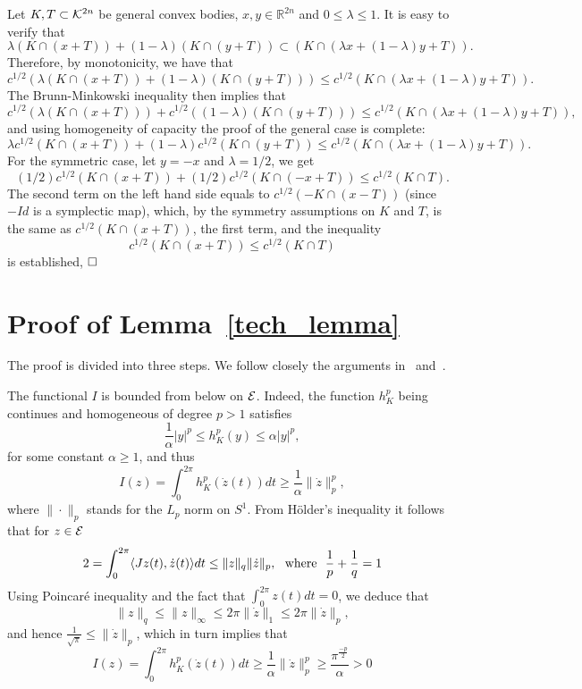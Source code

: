 \documentclass[12pt]{article}
\def\R{{\mathbb R}}
\begin{document}
 Let
$K,T \subset {\cal K}^{2n}$ be general convex bodies, $x,y \in
\R^{2n}$ and $0\le \lambda \le 1$. It is easy to verify that
\[ \lambda (K \cap (x+T)) + (1-\lambda) (K \cap
(y+T)) \subset (K \cap (\lambda x+(1-\lambda) y+ T)).\]
%
Therefore, by monotonicity, we have that
\[ c^{1/2}\left(\lambda (K \cap (x+T)) + (1-\lambda) (K \cap
(y+T))\right) \le  c^{1/2}\left(K \cap (\lambda x+(1-\lambda) y+
T)\right).\] The Brunn-Minkowski inequality then implies that
\[
c^{1/2}(\lambda(K \cap (x+T))) +   c^{1/2}((1-\lambda)(K \cap
(y+T))) \le c^{1/2}(K \cap (\lambda x+(1-\lambda) y+ T)),\] and
using homogeneity of capacity the proof of the general case is
complete:
\[ \lambda c^{1/2}(K \cap (x+T)) + (1-\lambda)  c^{1/2}(K \cap
(y+T)) \le c^{1/2}(K \cap (\lambda x+(1-\lambda) y+ T)).\] For the
symmetric case, let $y = -x$ and $\lambda = 1/2$, we get
\[ (1/2) c^{1/2}(K \cap (x+T)) + (1/2)  c^{1/2}(K \cap
(-x+T)) \le c^{1/2}(K \cap T).\] The second term on the left hand
side equals to $c^{1/2}(-K \cap (x-T))$ (since $-Id$ is a symplectic
map), which, by the symmetry assumptions on $K$ and $T$, is the same
as $c^{1/2}(K \cap (x+T))$, the first term, and the inequality
\[  c^{1/2}(K \cap (x+T))  \le c^{1/2}(K \cap T)\]
is established, $\hfill \square$







\section{Proof of Lemma~\ref{tech_lemma}}\label{prooflemma}

The proof is divided into three steps. We follow closely the
arguments in~\cite{HZ} and~\cite{MZ}.

 The functional $I$  is bounded from below
on ${\cal E}$. Indeed, the function $h_K^p$ being continues and
homogeneous of degree $p
> 1$ satisfies $$ {\frac 1 \alpha} |y|^{p} \leq h_K^p(y) \leq \alpha
|y|^{p},$$ for some constant $ \alpha \geq1$, and thus
$$ I(z) =  \int_0^{2\pi} h_K^p ( \dot{z}(t)) dt \geq {\frac 1 \alpha} \| \dot{z} \|^{p}_{p},$$
where $\| \cdot \|_p$ stands for the $L_p$ norm on $S^1$. From
H\"{o}lder's inequality it follows that for $z \in {\cal E}$
\begin{equation} \label{eq8} 2 = \int_0^{2\pi} \langle Jz(t),
\dot{z}(t) \rangle dt \leq  \| z \|_{q} \|\dot{z} \|_{p}, \ \ {\rm
where} \ \ {\frac 1 p} + {\frac 1 q} = 1 \end{equation} Using
Poincar\'e inequality and the fact that $ \int_0^{2 \pi} z(t)dt =
0$, we deduce that
\begin{equation} \label{eq9}  \|z \|_{q} \leq \|z \|_{\infty}
\leq 2 \pi \| \dot{z} \|_1 \leq 2 \pi \| \dot{z} \|_{p},
\end{equation} and hence ${
\frac 1 {\sqrt{\pi}}} \leq \| \dot{z} \|_{p}$, which in turn implies
that
\begin{equation}  \label{eq10} I(z) = \int_0^{2\pi} h_K^p ( \dot{z}(t)) dt \geq {\frac 1 \alpha} \|
\dot{z} \|^{p}_{p} \geq  {\frac {{\pi}^{\frac {-p} 2}} \alpha }  > 0
\end{equation}
\end{document}
